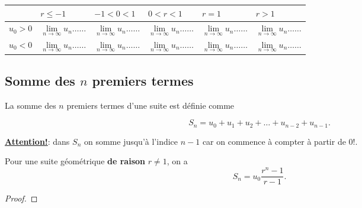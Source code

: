\documentclass[a4paper,12pt]{report}
\begin{document}
\begin{center}

\end{center}

\begin{center}

\end{center}

\begin{center}
\begin{tabular}{|p{1.2cm}|p{2.9cm}|p{2.9cm}|p{2.9cm}|p{2.9cm}|p{2.9cm}|}
\hline
 & \(r\le-1\) & \(-1<0<1\) & \(0<r<1\) & \(r=1\) & \(r>1\)\\[0pt]
\hline
\(u_0>0\) & \(\lim\limits_{n\to\infty}u_n\ldots\ldots\) & \(\lim\limits_{n\to\infty}u_n\ldots\ldots\) & \(\lim\limits_{n\to\infty}u_n\ldots\ldots\) & \(\lim\limits_{n\to\infty}u_n\ldots\ldots\) & \(\lim\limits_{n\to\infty}u_n\ldots\ldots\)\\[0pt]
\hline
\(u_0<0\) & \(\lim\limits_{n\to\infty}u_n\ldots\ldots\) & \(\lim\limits_{n\to\infty}u_n\ldots\ldots\) & \(\lim\limits_{n\to\infty}u_n\ldots\ldots\) & \(\lim\limits_{n\to\infty}u_n\ldots\ldots\) & \(\lim\limits_{n\to\infty}u_n\ldots\ldots\)\\[0pt]
\hline
\end{tabular}
\end{center}

\subsection{Somme des \(n\) premiers termes}
\label{sec:orgb6e1239}

La somme des \(n\) premiers termes d'une suite est définie comme

\[
S_n=u_0+u_1+u_2+\ldots+u_{n-2}+u_{n-1}.
\]

\uline{\textbf{Attention!}}: dans \(S_n\) on somme jusqu'à l'indice \(n-1\) car on
commence à compter à partir de \(0\)!.

\begin{propriete}
Pour une suite géométrique \textbf{de raison} \(r\neq 1\), on a
\[
S_n=u_0\frac{r^n-1}{r-1}.
\]
\end{propriete}
\begin{proof}
\dotfill

\dotfill

\dotfill

\dotfill

\dotfill

\dotfill

\dotfill

\dotfill

\dotfill

\dotfill

\dotfill

\dotfill

\dotfill
\end{proof}
\end{document}
